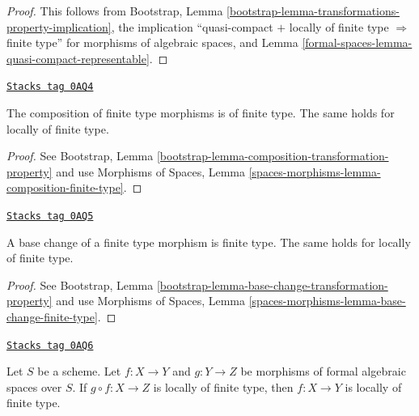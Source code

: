 \begin{proof}
This follows from Bootstrap, Lemma
\ref{bootstrap-lemma-transformations-property-implication},
the implication ``quasi-compact $+$ locally of finite type
$\Rightarrow$ finite type'' for morphisms of algebraic spaces, and
Lemma \ref{formal-spaces-lemma-quasi-compact-representable}.
\end{proof}

\begin{lemma}
\label{formal-spaces-lemma-composition-finite-type}
\href{https://stacks.math.columbia.edu/tag/0AQ4}{\texttt{Stacks tag 0AQ4}}

The composition of finite type morphisms is of finite type.
The same holds for locally of finite type.
\end{lemma}

\begin{proof}
See Bootstrap, Lemma \ref{bootstrap-lemma-composition-transformation-property}
and use Morphisms of Spaces, Lemma
\ref{spaces-morphisms-lemma-composition-finite-type}.
\end{proof}

\begin{lemma}
\label{formal-spaces-lemma-base-change-finite-type}
\href{https://stacks.math.columbia.edu/tag/0AQ5}{\texttt{Stacks tag 0AQ5}}

A base change of a finite type morphism is finite type.
The same holds for locally of finite type.
\end{lemma}

\begin{proof}
See Bootstrap, Lemma \ref{bootstrap-lemma-base-change-transformation-property}
and use Morphisms of Spaces, Lemma
\ref{spaces-morphisms-lemma-base-change-finite-type}.
\end{proof}

\begin{lemma}
\label{formal-spaces-lemma-permanence-finite-type}
\href{https://stacks.math.columbia.edu/tag/0AQ6}{\texttt{Stacks tag 0AQ6}}

Let $S$ be a scheme. Let $f : X \to Y$ and $g : Y \to Z$ be morphisms of
formal algebraic spaces over $S$. If $g \circ f : X \to Z$ is locally of
finite type, then $f : X \to Y$ is locally of finite type.
\end{lemma}

